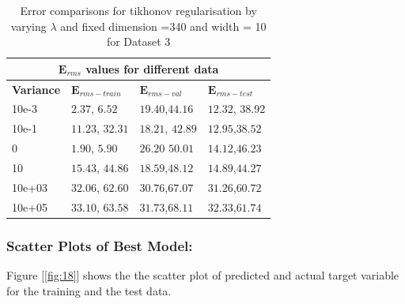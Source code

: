 {
\begin{table}[hptb]
\begin{tabular}{ |p{1.5cm}|p{3cm}|p{3cm}| p{3cm}|  }
\hline
\multicolumn{4}{|c|}{$\mathbf{E}_{rms}$ values for different data } \\
\hline
\rowcolor{lightgray} \textbf{Variance} & $\mathbf{E}_{rms-train}$ & $\mathbf{E}_{rms-val}$ & $\mathbf{E}_{rms-test}$ \\
\hline
  10e-3  &   $2.37 $, $ 6.52$       &       $19.40$,$44.16$        &  $12.32$, $38.92$  \\
 \hline
  10e-1  &   $11.23$, $32.31$       &       $18.21$, $42.89$ & $12.95$,$38.52$  \\
 \hline
  0  &    $1.90$, $5.90$     &      $26.20$  $50.01 $         &     $14.12$,$46.23$ \\
  \hline
  10     &   $15.43$,  $44.86$   &        $18.59$,$48.12$         &     $14.89$,$44.27$     \\
  \hline
  10e+03   &   $32.06$, $62.60$    &         $30.76$,$67.07$      &      $31.26$,$60.72$        \\
  \hline
  10e+05  &    $33.10$, $63.58$  &         $31.73$,$68.11$       &        $32.33$,$61.74$      \\
\hline
\end{tabular}
\caption{Error comparisons for tikhonov regularisation by varying $\lambda $  and fixed dimension =340 and width = 10 for Dataset 3}
\label{table:14}
\end{table}
}

\newpage
\subsubsection{Scatter Plots of Best Model:}

Figure [\ref{fig:18}] shows the the scatter plot of predicted and actual target variable for the training and the test data.

